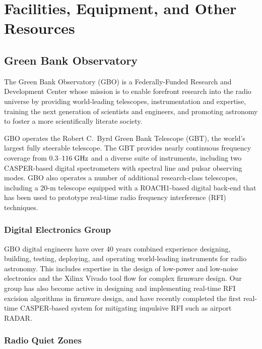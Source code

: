 \documentclass[10pt]{NSF}
\begin{document}
\section{Facilities, Equipment, and Other Resources}

\subsection{Green Bank Observatory}
\label{sec:gbo}

The Green Bank Observatory (GBO) is a Federally-Funded Research and
Development Center whose mission is to enable forefront research into
the radio universe by providing world-leading telescopes,
instrumentation and expertise, training the next generation of
scientists and engineers, and promoting astronomy to foster a more
scientifically literate society.

GBO operates the Robert C.\ Byrd Green Bank Telescope (GBT), the
world's largest fully steerable telescope.  The GBT provides nearly
continuous frequency coverage from $0.3$--$116\; \textrm{GHz}$ and a diverse
suite of instruments, including two CASPER-based digital spectrometers
with spectral line and pulsar observing modes.  GBO also operates a
number of additional research-class telescopes, including a 20-m
telescope equipped with a ROACH1-based digital back-end that has been
used to prototype real-time radio frequency interference (RFI)
techniques.

\subsubsection{Digital Electronics Group}
\label{sec:digital_group}

GBO digital engineers have over 40 years combined experience
designing, building, testing, deploying, and operating world-leading
instruments for radio astronomy.  This includes expertise in the
design of low-power and low-noise electronics and the Xilinx Vivado
tool flow for complex firmware design.  Our group has also become
active in designing and implementing real-time RFI excision algorithms
in firmware design, and have recently completed the first real-time
CASPER-based system for mitigating impulsive RFI such as airport
RADAR.

\subsubsection{Radio Quiet Zones}
\label{sec:quiet_zone}
\end{document}
